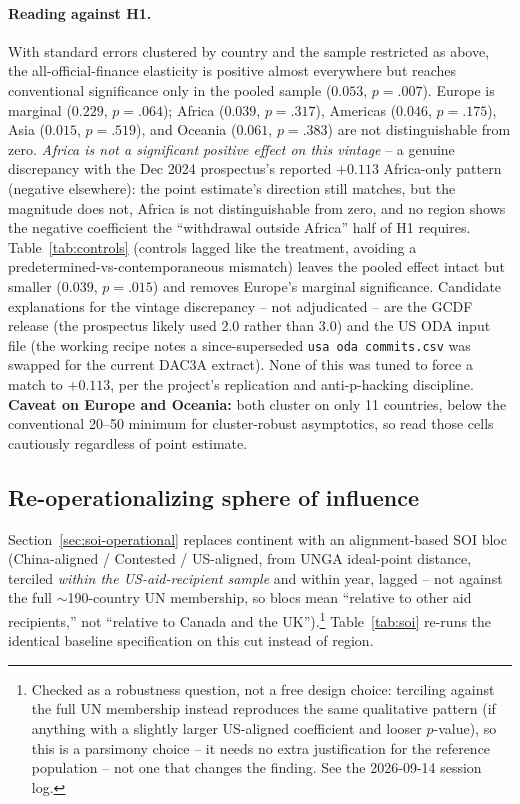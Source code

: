 \paragraph{Reading against H1.} With standard errors clustered by country and
the sample restricted as above, the all-official-finance elasticity is positive
almost everywhere but reaches conventional significance only in the pooled
sample ($0.053$, $p=.007$).            %
Europe is marginal ($0.229$, $p=.064$); Africa ($0.039$, $p=.317$), Americas
($0.046$, $p=.175$), Asia ($0.015$, $p=.519$), and Oceania ($0.061$, $p=.383$)
are not distinguishable from zero. \emph{Africa is not a significant positive
effect on this vintage} -- a genuine discrepancy with the Dec 2024 prospectus's
reported $+0.113$ Africa-only pattern (negative elsewhere): the point estimate's
direction still matches, but the magnitude does not, Africa is not
distinguishable from zero, and no region shows the negative coefficient the
``withdrawal outside Africa'' half of H1 requires. Table~\ref{tab:controls}
(controls lagged like the treatment, avoiding a predetermined-vs-contemporaneous
mismatch) leaves the pooled effect intact but smaller ($0.039$, $p=.015$) and
removes Europe's marginal significance. Candidate explanations for the vintage
discrepancy -- not adjudicated -- are the GCDF release (the prospectus likely
used 2.0 rather than 3.0) and the US ODA input file (the working recipe notes a
since-superseded \texttt{usa oda commits.csv} was swapped for the current DAC3A
extract). None of this was tuned to force a match to $+0.113$, per the project's
replication and anti-p-hacking discipline. \textbf{Caveat on Europe and
Oceania:} both cluster on only 11 countries, below the conventional 20--50
minimum for cluster-robust asymptotics, so read those cells cautiously
regardless of point estimate.


\subsection{Re-operationalizing sphere of influence}
\label{sec:quant-soi}
Section~\ref{sec:soi-operational} replaces continent with an alignment-based
SOI bloc (China-aligned / Contested / US-aligned, from UNGA ideal-point
distance, terciled \emph{within the US-aid-recipient sample} and within year,
lagged -- not against the full $\sim$190-country UN membership, so blocs mean
``relative to other aid recipients,'' not ``relative to Canada and the
UK'').\footnote{Checked as a robustness question, not a free design choice:
terciling against the full UN membership instead reproduces the same
qualitative pattern (if anything with a slightly larger US-aligned
coefficient and looser $p$-value), so this is a parsimony choice -- it needs
no extra justification for the reference population -- not one that changes
the finding. See the 2026-09-14 session log.} Table~\ref{tab:soi} re-runs the
identical baseline specification on this cut instead of region.

